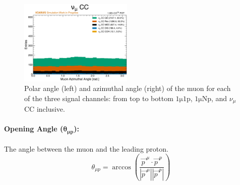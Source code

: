 \begin{figure}[!htb]
    \includegraphics[width=0.48\textwidth]{figures/neutrino_selection/signal_hist1d_1muX_muon_azimuthal_angle.pdf}
    \caption{Polar angle (left) and azimuthal angle (right) of the muon for each of the three signal channels: from top to bottom $\mathrm{1\mu 1p}$, $\mathrm{1\mu Np}$, and $\nu_\mu$ CC inclusive.}
    \label{fig:muon_angles}
\end{figure}

\paragraph{Opening Angle ($\mathbf{\theta_{\mu p}}$):}
The angle between the muon and the leading proton.
\begin{equation}
    \theta_{\mu p} = \arccos\left(\frac{\vec{p\ }^\mu \cdot \vec{p\ }^p}{|\vec{p\ }^\mu||\vec{p\ }^p|}\right)
\end{equation}


